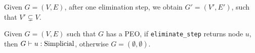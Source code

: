 
\begin{theorem}
    Given $G = (V, E)$, after one elimination step, we obtain $G'=(V', E')$, such that $V' \subsetneq V$. \Coqed
\end{theorem}

\pause





\begin{theorem}
    Given $G = (V, E)$ such that $G$ has a PEO, if \texttt{eliminate\_step} returns node $u$, then $\simplicial{u}{G}$, otherwise $G = (\emptyset, \emptyset)$. \Coqed
\end{theorem}





